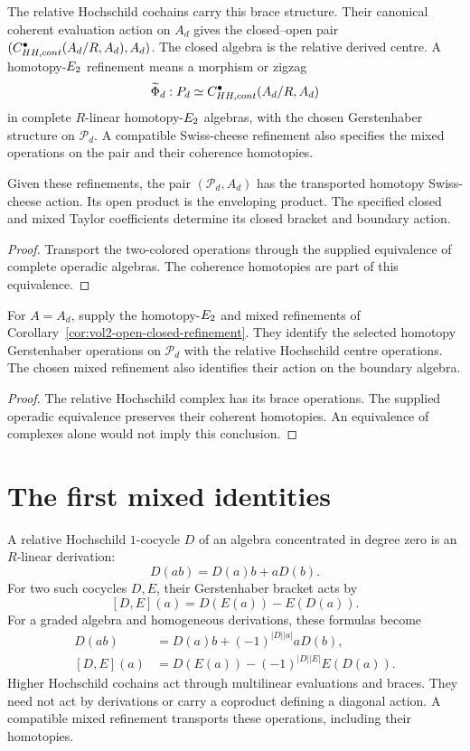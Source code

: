 The relative Hochschild cochains carry this brace structure.
Their canonical coherent evaluation action on $A_d$ gives the
closed--open pair
$(C^\bullet_{HH,cont}(A_d/R,A_d),A_d)$.
The closed algebra is the relative derived centre.
A homotopy-$E_2$ refinement means a morphism or zigzag
\[
 \widetilde\Phi_d:P_d
 \simeq C^\bullet_{HH,cont}(A_d/R,A_d)
\]
in complete $R$-linear homotopy-$E_2$ algebras,
with the chosen Gerstenhaber structure on $\mathcal P_d$.
A compatible Swiss-cheese refinement also specifies the mixed operations
on the pair and their coherence homotopies.

\begin{corollary}\label{cor:vol2-open-closed-refinement}
Given these refinements, the pair $(\mathcal P_d,A_d)$ has the transported
homotopy Swiss-cheese action.
Its open product is the enveloping product.
The specified closed and mixed Taylor coefficients determine its
closed bracket and boundary action.
\end{corollary}
\begin{proof}
Transport the two-colored operations through the supplied equivalence
of complete operadic algebras.
The coherence homotopies are part of this equivalence.
\end{proof}

\begin{theorem}
For $A=A_d$, supply the homotopy-$E_2$ and mixed refinements of
Corollary~\ref{cor:vol2-open-closed-refinement}.
They identify the selected homotopy Gerstenhaber operations on
$\mathcal P_d$ with the relative Hochschild centre operations.
The chosen mixed refinement also identifies their action on the boundary algebra.
\end{theorem}
\begin{proof}
The relative Hochschild complex has its brace operations.
The supplied operadic equivalence preserves their coherent homotopies.
An equivalence of complexes alone would not imply this conclusion.
\end{proof}

\section{The first mixed identities}
A relative Hochschild $1$-cocycle $D$ of an algebra concentrated in degree zero
is an $R$-linear derivation:
\[
 D(ab)=D(a)b+aD(b).
\]
For two such cocycles $D,E$, their Gerstenhaber bracket acts by
\[
 [D,E](a)=D(E(a))-E(D(a)).
\]
For a graded algebra and homogeneous derivations, these formulas become
\[
\begin{split}
 D(ab)&=D(a)b+(-1)^{|D||a|}aD(b),\\
 [D,E](a)&=D(E(a))-(-1)^{|D||E|}E(D(a)).
\end{split}
\]
Higher Hochschild cochains act through multilinear evaluations and braces.
They need not act by derivations or carry a coproduct defining a diagonal action.
A compatible mixed refinement transports these operations, including their homotopies.

